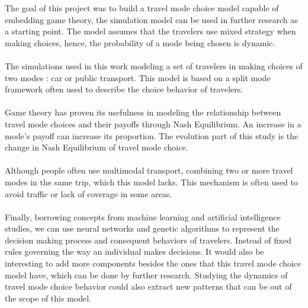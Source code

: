 The goal of this project was to build a travel mode choice model capable of embedding game theory, the simulation model can be used in further research as a starting point. The model assumes that the travelers use mixed strategy when making choices, hence, the probability of a mode being chosen is dynamic. \\

\paragraph{}
The simulations used in this work modeling a set of travelers in making choices of two modes : car or public transport. This model is based on a split mode framework often used to describe the choice behavior of travelers.
\paragraph{}
Game theory has proven its usefulness in modeling the relationship between travel mode choices and their payoffs through Nash Equilibrium. An increase in a mode's payoff can increase its proportion. The evolution part of this study is the change in Nash Equilibrium of travel mode choice.
\paragraph{}
Although people often use multimodal transport, combining two or more travel modes in the same trip, which this model lacks. This mechanism is often used to avoid traffic or lack of coverage in some areas.
\paragraph{}Finally, borrowing concepts from machine learning and artificial intelligence studies, we can use neural networks and genetic algorithms to represent the decision making process and consequent behaviors of travelers. Instead of fixed rules governing the way an individual makes decisions. It would also be interesting to add more components besides the ones that this travel mode choice model have, which can be done by further research. Studying the dynamics of travel mode choice behavior could also extract new patterns that can be out of the scope of this model.